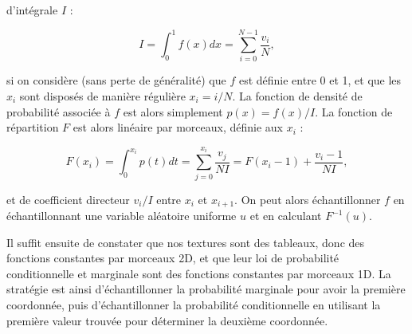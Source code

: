 d'intégrale $I$ :

\begin{equation}
    I = \int_{0}^{1} f(x) dx = \sum_{i=0}^{N-1} \frac{v_i}N,
\end{equation}

si on considère (sans perte de généralité) que $f$ est définie entre 0 et 1, et que les $x_i$ sont disposés de manière régulière $x_i = i / N$. La fonction de densité de probabilité associée à $f$ est alors simplement $p(x) = f(x) / I$. La fonction de répartition $F$ est alors linéaire par morceaux, définie aux $x_i$ :

\begin{equation}
    F(x_i) = \int_{0}^{x_i} p(t) dt = \sum_{j=0}^{x_i} \frac{v_j}{NI} = F(x_i-1) + \frac{v_i-1}{NI},
\end{equation}

et de coefficient directeur $v_i/I$ entre $x_i$ et $x_{i+1}$. On peut alors échantillonner $f$ en échantillonnant une variable aléatoire uniforme $u$ et en calculant $F^{-1}(u)$.

%
%
%


Il suffit ensuite de constater que nos textures sont des tableaux, donc des fonctions constantes par morceaux 2D, et que leur loi de probabilité conditionnelle et marginale sont des fonctions constantes par morceaux 1D. La stratégie est ainsi d'échantillonner la probabilité marginale pour avoir la première coordonnée, puis d'échantillonner la probabilité conditionnelle en utilisant la première valeur trouvée pour déterminer la deuxième coordonnée.

